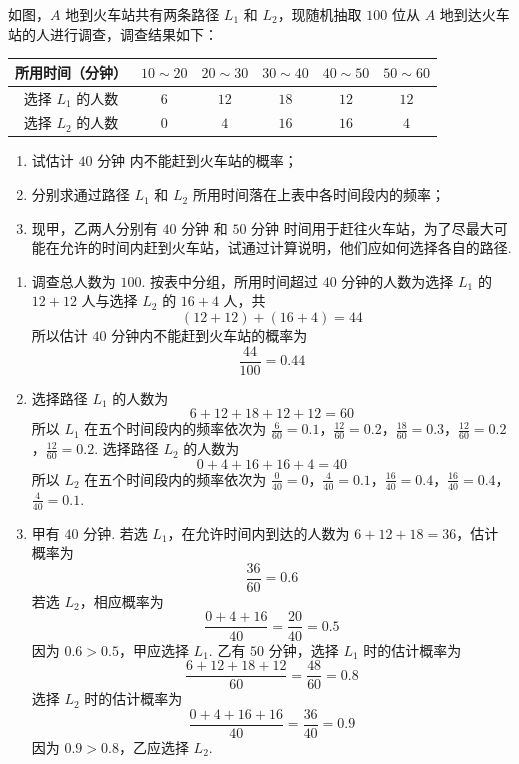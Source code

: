 \begin{problem}
如图，\(A\) 地到火车站共有两条路径 \(L_{1}\) 和 \(L_{2}\)，现随机抽取 \(100\) 位从 \(A\) 地到达火车站的人进行调查，调查结果如下：

\begin{center}
\begin{tabular}{c|ccccc}
\hline
所用时间（分钟） & \(10\sim20\) & \(20\sim30\) & \(30\sim40\) & \(40\sim50\) & \(50\sim60\) \\
\hline
选择 \(L_{1}\) 的人数 & \(6\) & \(12\) & \(18\) & \(12\) & \(12\) \\
选择 \(L_{2}\) 的人数 & \(0\) & \(4\) & \(16\) & \(16\) & \(4\) \\
\hline
\end{tabular}
\end{center}

\begin{enumerate}
\item 试估计 \(40\text{ 分钟}\) 内不能赶到火车站的概率；
\item 分别求通过路径 \(L_{1}\) 和 \(L_{2}\) 所用时间落在上表中各时间段内的频率；
\item 现甲，乙两人分别有 \(40\text{ 分钟}\) 和 \(50\text{ 分钟}\) 时间用于赶往火车站，为了尽最大可能在允许的时间内赶到火车站，试通过计算说明，他们应如何选择各自的路径.
\end{enumerate}

\end{problem}

\begin{solution}
\begin{enumerate}
\item 调查总人数为 \(100\). 按表中分组，所用时间超过 \(40\) 分钟的人数为选择 \(L_1\) 的 \(12+12\) 人与选择 \(L_2\) 的 \(16+4\) 人，共
\[
(12+12)+(16+4)=44
\]
所以估计 \(40\) 分钟内不能赶到火车站的概率为
\[
\frac{44}{100}=0.44
\]
\item 选择路径 \(L_1\) 的人数为
\[
6+12+18+12+12=60
\]
所以 \(L_1\) 在五个时间段内的频率依次为 \(\frac6{60}=0.1\)，\(\frac{12}{60}=0.2\)，\(\frac{18}{60}=0.3\)，\(\frac{12}{60}=0.2\)，\(\frac{12}{60}=0.2\).
选择路径 \(L_2\) 的人数为
\[
0+4+16+16+4=40
\]
所以 \(L_2\) 在五个时间段内的频率依次为 \(\frac0{40}=0\)，\(\frac4{40}=0.1\)，\(\frac{16}{40}=0.4\)，\(\frac{16}{40}=0.4\)，\(\frac4{40}=0.1\).
\item 甲有 \(40\) 分钟. 若选 \(L_1\)，在允许时间内到达的人数为 \(6+12+18=36\)，估计概率为
\[
\frac{36}{60}=0.6
\]
若选 \(L_2\)，相应概率为
\[
\frac{0+4+16}{40}=\frac{20}{40}=0.5
\]
因为 \(0.6>0.5\)，甲应选择 \(L_1\). 乙有 \(50\) 分钟，选择 \(L_1\) 时的估计概率为
\[
\frac{6+12+18+12}{60}=\frac{48}{60}=0.8
\]
选择 \(L_2\) 时的估计概率为
\[
\frac{0+4+16+16}{40}=\frac{36}{40}=0.9
\]
因为 \(0.9>0.8\)，乙应选择 \(L_2\).
\end{enumerate}
\end{solution}

